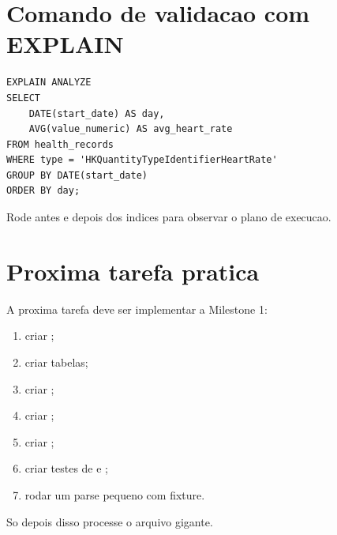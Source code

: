 \section{Comando de validacao com EXPLAIN}

\begin{lstlisting}[style=devbuttersql]
EXPLAIN ANALYZE
SELECT
    DATE(start_date) AS day,
    AVG(value_numeric) AS avg_heart_rate
FROM health_records
WHERE type = 'HKQuantityTypeIdentifierHeartRate'
GROUP BY DATE(start_date)
ORDER BY day;
\end{lstlisting}

Rode antes e depois dos indices para observar o plano de execucao.

\section{Proxima tarefa pratica}

A proxima tarefa deve ser implementar a Milestone 1:

\begin{enumerate}
  \item criar ;
  \item criar tabelas;
  \item criar ;
  \item criar ;
  \item criar ;
  \item criar testes de  e ;
  \item rodar um parse pequeno com fixture.
\end{enumerate}

So depois disso processe o arquivo gigante.
